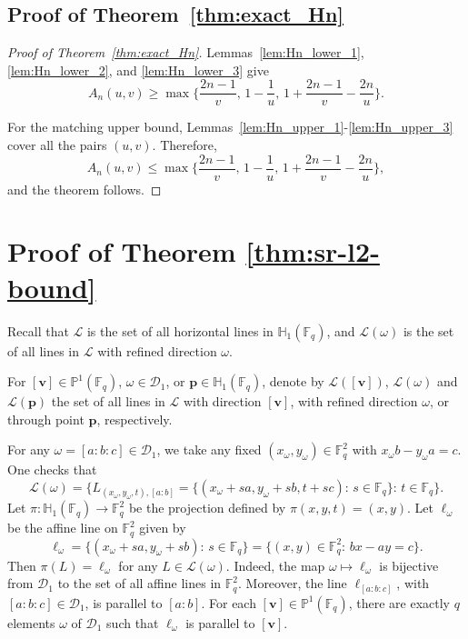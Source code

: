 \documentclass[11pt]{article}
\newcommand{\F}{\mathbb{F}}
\newcommand{\PP}{\mathbb{P}}
\newcommand{\HH}{\mathbb{H}}
\newcommand{\cD}{\mathcal{D}}
\newcommand{\cL}{\mathcal{L}}
\newcommand{\1}{\mathbf 1}
\newcommand{\Fq}{\mathbb{F}_q}
\newcommand{\bfp}{\mathbf{p}}
\newcommand{\bfv}{\mathbf{v}}
\begin{document}
\subsection{Proof of Theorem~\ref{thm:exact_Hn}}
\begin{proof}[Proof of Theorem~\ref{thm:exact_Hn}]
Lemmas~\ref{lem:Hn_lower_1}, \ref{lem:Hn_lower_2}, and \ref{lem:Hn_lower_3} give
\[
A_n(u,v)\ge \max\Bigg\{\frac{2n-1}{v},\, 1-\frac1u,\, 1+\frac{2n-1}{v}-\frac{2n}{u}\Bigg\}.
\]

For the matching upper bound,  Lemmas~\ref{lem:Hn_upper_1}-\ref{lem:Hn_upper_3} cover all the pairs $(u,v)$. Therefore,
\[
A_n(u,v)\le \max\Bigg\{\frac{2n-1}{v},\, 1-\frac1u,\, 1+\frac{2n-1}{v}-\frac{2n}{u}\Bigg\},
\]
and the theorem follows.
\end{proof}








\section{Proof of Theorem \ref{thm:sr-l2-bound}}\label{section8}

Recall that $\mathcal L$ is the set of all horizontal lines in $\mathbb H_1(\F_q)$, and $\cL(\omega)$ is the set of all lines in $\cL$ with refined direction $\omega$. 

For $[\bfv] \in \PP^1(\Fq)$, $\omega\in \cD_1$, or $\bfp\in \HH_1(\Fq)$, denote by $\cL([\bfv])$, $\cL(\omega)$ and $\cL(\bfp)$ the set of all lines in $\cL$ with direction $[\bfv]$, with refined direction $\omega$, or through point $\bfp$, respectively.

For any $\omega=[a:b:c]\in \cD_1$, we take any fixed $(x_\omega,y_\omega)\in \Fq^2$ with $x_\omega b-y_\omega a=c$. One checks that 
\begin{equation} \label{eq_q_lines}
\cL(\omega)=\Big\{L_{(x_\omega,y_\omega,t),[a:b]}=\{(x_\omega+sa,y_\omega+sb,t+sc):\, s\in\Fq\}:\,  t\in \Fq\Big\}.
\end{equation}
Let $\pi:\mathbb H_1(\mathbb F_q)\to\mathbb F_q^2$ be the projection defined by $\pi(x,y,t)=(x,y)$. Let $\ell_\omega$ be the affine line on $\Fq^2$ given by
\[
\ell_\omega=\{(x_\omega+sa,y_\omega+sb):\, s\in \Fq\}=\{(x,y)\in \F_q^2:\, bx-ay=c\}.
\]
Then $\pi(L)=\ell_\omega$ for any $L\in \cL(\omega)$. Indeed, the map $\omega\mapsto \ell_\omega$ is bijective from $\cD_1$ to the set of all affine lines in $\Fq^2$. Moreover, the line $\ell_{[a:b:c]}$, with $[a:b:c]\in \cD_1$, is parallel to $[a:b]$. For each $[\bfv]\in \mathbb P^1(\Fq)$, there are exactly $q$ elements $\omega$ of $\cD_1$ such that $\ell_\omega$ is parallel to $[\bfv]$.
\end{document}
